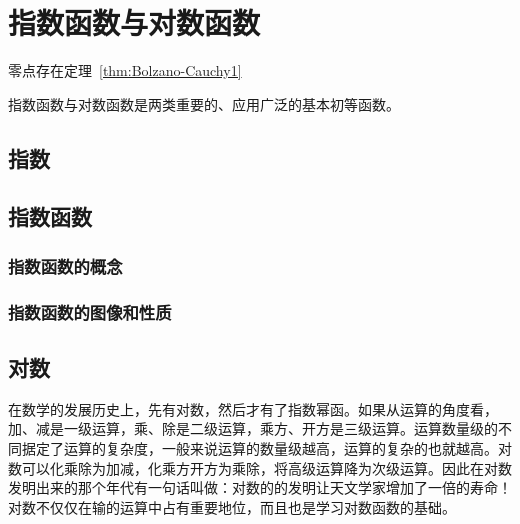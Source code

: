 \chapter{指数函数与对数函数}
\label{ch:指数函数与对数函数}

\begin{introduction}
  \item 零点存在定理~\ref{thm:Bolzano-Cauchy1}
\end{introduction}

指数函数与对数函数是两类重要的、应用广泛的基本初等函数。

\section{指数}

\section{指数函数}

\subsection{指数函数的概念}

\subsection{指数函数的图像和性质}


\section{对数}

在数学的发展历史上，先有对数，然后才有了指数幂函。如果从运算的角度看，加、减是一级运算，乘、除是二级运算，乘方、开方是三级运算。运算数量级的不同据定了运算的复杂度，一般来说运算的数量级越高，运算的复杂的也就越高。对数可以化乘除为加减，化乘方开方为乘除，将高级运算降为次级运算。因此在对数发明出来的那个年代有一句话叫做：对数的的发明让天文学家增加了一倍的寿命！对数不仅仅在输的运算中占有重要地位，而且也是学习对数函数的基础。

